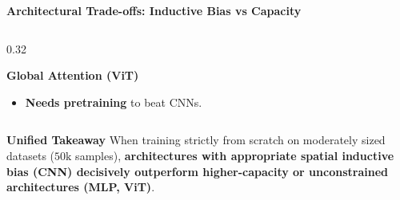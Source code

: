 \documentclass[aspectratio=169, 10pt]{beamer}
\begin{document}
\begin{frame}{\textbf{Architectural Trade-offs: Inductive Bias vs Capacity}}
\begin{columns}[t]
\begin{column}{0.32\textwidth}
\begin{block}{\textbf{Global Attention (ViT)}}
\begin{itemize}
          \item \textbf{Needs pretraining} to beat CNNs.
        \end{itemize}
      \end{block}
    \end{column}
  \end{columns}
  \vspace{0.5em}
  \begin{block}{\centering \textbf{Unified Takeaway}}
    \centering\scriptsize
    When training strictly from scratch on moderately sized datasets ($50\text{k}$ samples), \textbf{architectures with appropriate spatial inductive bias (CNN) decisively outperform higher-capacity or unconstrained architectures (MLP, ViT)}.
  \end{block}
\end{frame}
\end{document}
